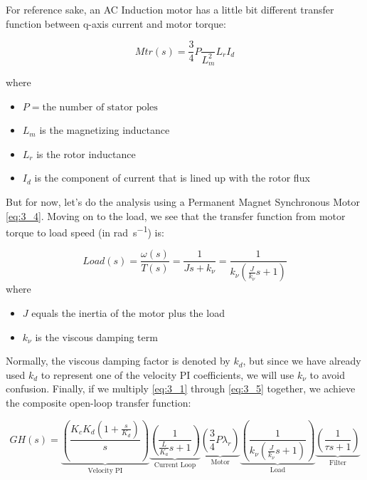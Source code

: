 For reference sake, an AC Induction motor has a little bit different transfer function between q-axis current and motor torque:

\begin{equation*}
    Mtr(s) = \frac{3}{4}P \frac{}{L_m^2}{L_r}I_d
\end{equation*}

where
\begin{itemize}
    \item $P = \text{the number of stator poles}$
    \item $L_m$ is the magnetizing inductance
    \item $L_r$ is the rotor inductance
    \item $I_d$ is the component of current that is lined up with the rotor flux
\end{itemize}

But for now, let’s do the analysis using a Permanent Magnet Synchronous Motor \ref{eq:3_4}.  Moving on to the load, we see that the transfer function from motor torque to load speed (in \unit{\radian\per\second}) is:

\begin{equation}\label{eq:3_5}
    Load(s) = \frac{\omega(s)}{T(s)} = \frac{1}{Js+k_\nu}=\frac{1}{k_\nu\left(\frac{J}{k_\nu}s+1\right)}
\end{equation}
where
\begin{itemize}
    \item $J$ equals the inertia of the motor plus the load
    \item $k_\nu$ is the viscous damping term
\end{itemize}

Normally, the viscous damping factor is denoted by $k_d$, but since we have already used $k_d$ to represent one of the velocity PI coefficients, we will use $k_\nu$ to avoid confusion.  Finally, if we multiply \ref{eq:3_1} through \ref{eq:3_5} together, we achieve the composite open-loop transfer function:

\begin{equation}\label{eq:3_6}
    GH(s) = \underbrace{\left(\frac{K_cK_d\left(1+\frac{s}{K_d}\right)}{s}\right)}_{\text{Velocity PI}}
    \underbrace{\left(\frac{1}{\frac{L}{K_a}s+1}\right)}_{\text{Current Loop}}
    \underbrace{\left(\frac{3}{4}P\lambda_r\right)}_{\text{Motor}}
    \underbrace{\left(\frac{1}{k_\nu\left(\frac{J}{k_\nu}s+1\right)}\right)}_{\text{Load}}
    \underbrace{\left(\frac{1}{\tau s + 1}\right)}_{\text{Filter}}
\end{equation}

